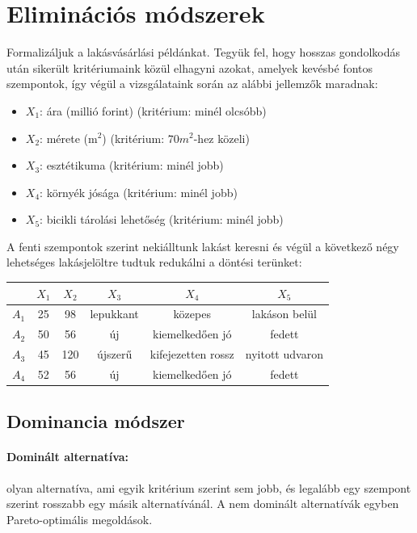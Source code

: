 \documentclass[a4paper,12pt]{article}
\begin{document}
\section{Eliminációs módszerek}

Formalizáljuk a lakásvásárlási példánkat. Tegyük fel, hogy hosszas gondolkodás után sikerült kritériumaink közül elhagyni azokat, amelyek kevésbé fontos szempontok, így végül a vizsgálataink során az alábbi jellemzők maradnak: 

\begin{itemize}
\item $X_{1}$: ára (millió forint) (kritérium: minél olcsóbb)
\item $X_{2}$: mérete (m$^{2}$) (kritérium: $70m^2$-hez közeli)
\item $X_{3}$: esztétikuma (kritérium: minél jobb)
\item $X_{4}$: környék jósága (kritérium: minél jobb)
\item $X_{5}$: bicikli tárolási lehetőség (kritérium: minél jobb)

\end{itemize}

A fenti szempontok szerint nekiálltunk lakást keresni és végül a következő négy lehetséges lakásjelöltre tudtuk redukálni a döntési terünket:
\begin{center}
\begin{tabular}{c||c|c|c|c|c}
 & $X_1$& $X_2$& $X_3$& $X_4$& $X_5$ \\
 \hline
 $A_1$&25  &98 & lepukkant & közepes & lakáson belül \\
 $A_2$&50  &56 & új& kiemelkedően jó& fedett \\
 $A_3$&45  &120 & újszerű & kifejezetten rossz& nyitott udvaron \\
 $A_4$&52  &56 & új& kiemelkedően jó& fedett \\
\end{tabular}
\end{center}

\subsection{Dominancia módszer}

\paragraph{Dominált alternatíva:} olyan alternatíva, ami egyik kritérium szerint sem jobb, és legalább egy szempont szerint rosszabb egy másik alternatívánál.  A nem dominált alternatívák egyben Pareto-optimális megoldások.
\end{document}
